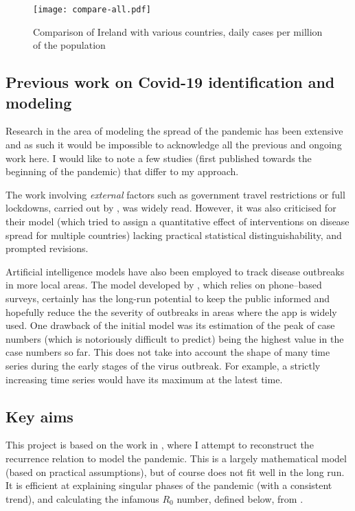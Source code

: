\begin{figure}[H]
\texttt{[image: compare-all.pdf]}
\endminipage
\caption{Comparison of Ireland with various countries, daily cases per million of the population}
\end{figure}




\subsection{Previous work on Covid-19 identification and modeling}
Research in the area of modeling the spread of the pandemic has been extensive and as such it would be impossible to acknowledge all the previous and ongoing work here. I would like to note a few studies (first published towards the beginning of the pandemic) that differ to my approach.

The work involving \textit{external} factors such as government travel restrictions or full lockdowns, carried out by \cite{flaxman20}, was widely read. However, it was also criticised for their model (which tried to assign a quantitative effect of interventions on disease spread for multiple countries) lacking practical statistical distinguishability, and prompted revisions.

Artificial intelligence models have also been employed to track disease outbreaks in more local areas. The model developed by \cite{SrinivasaRao2020}, which relies on phone–based surveys, certainly has the long-run potential to keep the public informed and hopefully reduce the the severity of outbreaks in areas where the app is widely used. One drawback of the initial model was its estimation of the peak of case numbers (which is notoriously difficult to predict) being the highest value in the case numbers so far. This does not take into account the shape of many time series during the early stages of the virus outbreak. For example, a strictly increasing time series would have its maximum at the latest time.


\subsection{Key aims}

This project is based on the work in \cite{grigor20}, where I attempt to reconstruct the recurrence relation to model the pandemic. This is a largely mathematical model (based on practical assumptions), but of course does not fit well in the long run. It is efficient at explaining singular phases of the pandemic (with a consistent trend), and calculating the infamous $R_0$ number, defined below, from \cite{epid08}. 

